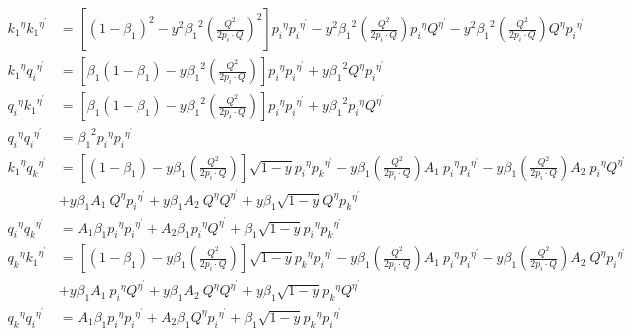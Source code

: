 \begin{equation}
\begin{split}
{k_1}^{{\eta}}{k_1}^{{\eta}^{\prime}}&=[(1-\beta_1)^2-y^2 {\beta_1}^2 (\frac{Q^2}{2p_i \cdot Q})^2] {p_i}^{{\eta}}{p_i}^{{\eta}^{\prime}}-y^2 {\beta_1}^2 (\frac{Q^2}{2p_i \cdot Q}){p_i}^{{\eta}}{Q}^{{\eta}^{\prime}}-y^2 {\beta_1}^2 (\frac{Q^2}{2p_i \cdot Q}){Q}^{{\eta}}{p_i}^{{\eta}^{\prime}}\\
{k_1}^{{\eta}}{q_i}^{{\eta}^{\prime}}&=[\beta_1(1-\beta_1)-y {\beta_1}^2 (\frac{Q^2}{2p_i \cdot Q})] {p_i}^{{\eta}}{p_i}^{{\eta}^{\prime}}+y {\beta_1}^2 {Q}^{{\eta}}{p_i}^{{\eta}^{\prime}}\\
{q_i}^{{\eta}}{k_1}^{{\eta}^{\prime}}&=[\beta_1(1-\beta_1)-y {\beta_1}^2 (\frac{Q^2}{2p_i \cdot Q})] {p_i}^{{\eta}}{p_i}^{{\eta}^{\prime}}+y {\beta_1}^2 {p_i}^{{\eta}}{Q}^{{\eta}^{\prime}}\\
{q_i}^{{\eta}}{q_i}^{{\eta}^{\prime}}&={\beta_1}^2 {p_i}^{{\eta}}{p_i}^{{\eta}^{\prime}}\\
{k_1}^{{\eta}}{q_k}^{{\eta}^{\prime}}&= [(1-\beta_1)-y\beta_1 (\frac{Q^2}{2p_i \cdot Q})] \sqrt{1-y}{p_i}^{{\eta}}{{p_k}^{{\eta}^{\prime}}}-y {\beta_1} (\frac{Q^2}{2p_i \cdot Q}) A_1 \:{p_i}^{{\eta}}{p_i}^{{\eta}^{\prime}}
-y {\beta_1} (\frac{Q^2}{2p_i \cdot Q}) A_2\: {p_i}^{{\eta}}{Q}^{{\eta}^{\prime}}\\
&+y {\beta_1} A_1 \:{Q}^{{\eta}}{p_i}^{{\eta}^{\prime}}+y {\beta_1} A_2 \:{Q}^{{\eta}}{Q}^{{\eta}^{\prime}}+y {\beta_1}\sqrt{1-y}{Q}^{{\eta}}{{p_k}^{{\eta}^{\prime}}}\\
{q_i}^{{\eta}}{q_k}^{{\eta}^{\prime}}&=A_1\beta_1 {p_i}^{{\eta}}{{p_i}^{{\eta}^{\prime}}}+A_2\beta_1 {p_i}^{{\eta}}{{Q}^{{\eta}^{\prime}}}+\beta_1 \sqrt{1-y}{p_i}^{{\eta}}{{p_k}^{{\eta}^{\prime}}}\\
{q_k}^{\eta}{k_1}^{{{\eta}}^{\prime}}&=[(1-\beta_1)-y\beta_1 (\frac{Q^2}{2p_i \cdot Q})] \sqrt{1-y}{p_k}^{{\eta}}{{p_i}^{{\eta}^{\prime}}}-y {\beta_1} (\frac{Q^2}{2p_i \cdot Q}) A_1 \:{p_i}^{{\eta}}{p_i}^{{\eta}^{\prime}}
-y {\beta_1} (\frac{Q^2}{2p_i \cdot Q}) A_2\: {Q}^{{\eta}}{p_i}^{{\eta}^{\prime}}\\
&+y {\beta_1} A_1 \:{p_i}^{{\eta}}{Q}^{{\eta}^{\prime}}+y {\beta_1} A_2 \:{Q}^{{\eta}}{Q}^{{\eta}^{\prime}}+y {\beta_1}\sqrt{1-y}{p_k}^{{\eta}}{{Q}^{{\eta}^{\prime}}}\\
{q_k}^{\eta}{q_i}^{{{\eta}}^{\prime}}&=A_1\beta_1 {p_i}^{{\eta}}{{p_i}^{{\eta}^{\prime}}}+A_2\beta_1 {Q}^{{\eta}}{{p_i}^{{\eta}^{\prime}}}+\beta_1 \sqrt{1-y}{p_k}^{{\eta}}{{p_i}^{{\eta}^{\prime}}}\\
\end{split}
\label{Para}
\end{equation}


